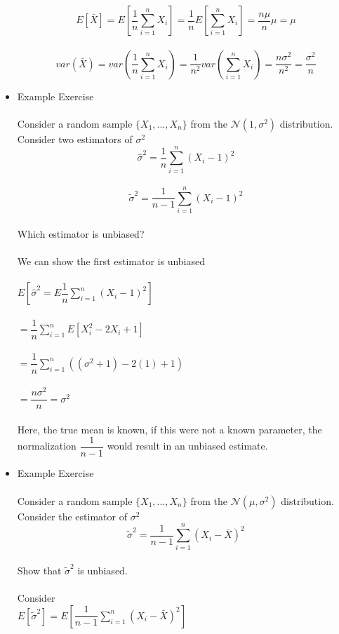 \documentclass{article}
\begin{document}
\begin{itemize}
    $$E[\bar{X}]=E[\dfrac{1}{n}\sum_{i=1}^nX_i]=\dfrac{1}{n}E[\sum_{i=1}^nX_i]=\dfrac{n\mu}{n}\mu=\mu$$\\
    $$var(\bar{X})=var(\dfrac{1}{n}\sum_{i=1}^nX_i)=\dfrac{1}{n^2}var(\sum_{i=1}^nX_i)=\dfrac{n\sigma^2}{n^2}=\dfrac{\sigma^2}{n}$$
    \item Example Exercise\\\\
    Consider a random sample $\{X_1,...,X_n\}$ from the $\mathcal{N}(1,\sigma^2)$ distribution.\\
    Consider two estimators of $\sigma^2$\\
    $$\hat{\sigma}^2=\dfrac{1}{n}\sum_{i=1}^n(X_i-1)^2$$\\
    $$\tilde{\sigma}^2=\dfrac{1}{n-1}\sum_{i=1}^n(X_i-1)^2$$\\
    Which estimator is unbiased?\\\\
    We can show the first estimator is unbiased\\\\
    $E[\hat{\sigma}^2=E\dfrac{1}{n}\sum_{i=1}^n(X_i-1)^2]$\\\\
    $=\dfrac{1}{n}\sum_{i=1}^nE[X_i^2-2X_i+1]$\\\\
    $=\dfrac{1}{n}\sum_{i=1}^n((\sigma^2+1)-2(1)+1)$\\\\
    $=\dfrac{n\sigma^2}{n}=\sigma^2$\\\\
    Here, the true mean is known, if this were not a known parameter, the normalization $\dfrac{1}{n-1}$ would result in an unbiased estimate. 
    \item Example Exercise\\\\
    Consider a random sample $\{X_1,...,X_n\}$ from the $\mathcal{N}(\mu,\sigma^2)$ distribution.\\
    Consider the estimator of $\sigma^2$\\
    $$\tilde{\sigma}^2=\dfrac{1}{n-1}\sum_{i=1}^n(X_i-\bar{X})^2$$\\
    Show that $\tilde{\sigma}^2$ is unbiased.\\\\
    Consider\\
    $E[\tilde{\sigma}^2]=E[\dfrac{1}{n-1}\sum_{i=1}^n(X_i-\bar{X})^2]$\\\\

\end{itemize}
\end{document}

